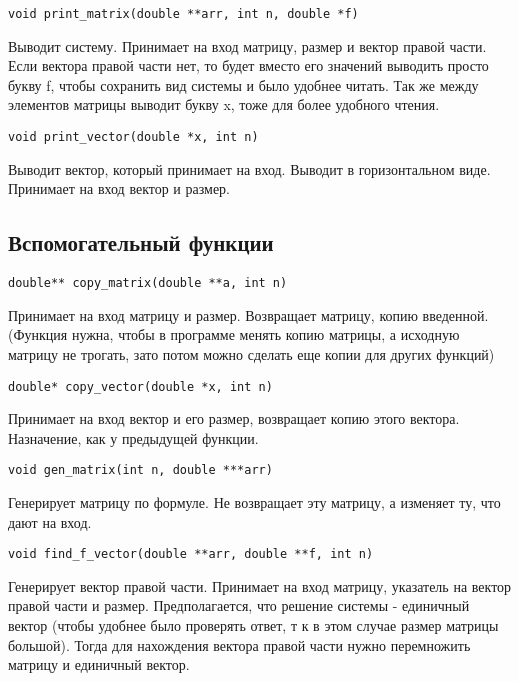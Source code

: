 \documentclass[a4paper,12pt,titlepage,finall]{article}
\begin{document}
\begin{verbatim}
void print_matrix(double **arr, int n, double *f)
\end{verbatim}

Выводит систему. Принимает на вход матрицу, размер и вектор правой части. Если вектора правой части нет, то будет вместо его значений выводить просто букву f, чтобы сохранить вид системы и было удобнее читать. Так же между элементов матрицы выводит букву x, тоже для более удобного чтения.

\begin{verbatim}
void print_vector(double *x, int n)
\end{verbatim}

Выводит вектор, который принимает на вход. Выводит в горизонтальном виде. Принимает на вход вектор и размер.


\subsection{Вспомогательный функции}

\begin{verbatim}
double** copy_matrix(double **a, int n)
\end{verbatim}

Принимает на вход матрицу и размер. Возвращает матрицу, копию введенной. (Функция нужна, чтобы в программе менять копию матрицы, а исходную матрицу не трогать, зато потом можно сделать еще копии для других функций)

\begin{verbatim}
double* copy_vector(double *x, int n)
\end{verbatim}

Принимает на вход вектор и его размер, возвращает копию этого вектора. Назначение, как у предыдущей функции.

\begin{verbatim}
void gen_matrix(int n, double ***arr)
\end{verbatim}

Генерирует матрицу по формуле. Не возвращает эту матрицу, а изменяет ту, что дают на вход.

\begin{verbatim}
void find_f_vector(double **arr, double **f, int n)
\end{verbatim}

Генерирует вектор правой части. Принимает на вход матрицу, указатель на вектор правой части и размер. Предполагается, что решение системы - единичный вектор (чтобы удобнее было проверять ответ, т к в этом случае размер матрицы большой). Тогда для нахождения вектора правой части нужно перемножить матрицу и единичный вектор.
\end{document}
